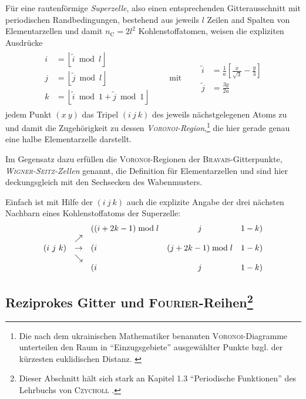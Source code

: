 \documentclass[a4paper, 10pt, twoside, openany]{book} %
\newcommand \bracks[1]{\left [ #1 \right ]}
\newcommand \floor[1]{\left \lfloor #1 \right \rfloor}
\def \mod {\bmod}
\def \nC {n_\mathrm{C}}
\begin{document}
Für eine rautenförmige \emph{Superzelle}, also einen entsprechenden Gitterausschnitt mit periodischen Randbedingungen, bestehend aus jeweils $l$ Zeilen and Spalten von Elementarzellen und damit $\nC = 2 l^2$ Kohlenstoffatomen, weisen die expliziten Ausdrücke
%
\begin{align}
    \begin{aligned}
        i &= \floor{\tilde i \mod l} \\
        j &= \floor{\tilde j \mod l} \\
        k &= \floor{\tilde i \mod 1 + \tilde j \mod 1}
    \end{aligned}
    \qquad \text{mit} \qquad
    \begin{aligned}
        \tilde i &= \frac 1 a \bracks{\frac x {\sqrt 3} - \frac y 3} \\
        \tilde j &= \frac{3 y}{2 a}
    \end{aligned}
    \label{ijk}
\end{align}
%
jedem Punkt $(x \ y)$ das Tripel $(i \ j \ k)$ des jeweils nächstgelegenen Atoms zu und damit die Zugehörigkeit zu dessen \emph{\textsc{Voronoi}-Region},\footnote{Die nach dem ukrainischen Mathematiker benannten \textsc{Voronoi}-Diagramme unterteilen den Raum in "`Einzugsgebiete"' ausgewählter Punkte bzgl. der kürzesten euklidischen Distanz. \cite[S.~10]{Edelsbrunner}} die hier gerade genau eine halbe Elementarzelle darstellt.

Im Gegensatz dazu erfüllen die \textsc{Voronoi}-Regionen der \textsc{Bravais}-Gitterpunkte, \emph{\textsc{Wigner-Seitz}-Zellen} genannt, die Definition für Elementarzellen und sind hier deckungsgleich mit den Sechsecken des Wabenmusters.

Einfach ist mit Hilfe der $(i \ j \ k)$ auch die explizite Angabe der drei nächsten Nachbarn eines Kohlenstoffatoms der Superzelle:
%
\begin{align*}
    \begin{array}{r c l c r}
        & & ((i + 2 k - 1) \mod l & j & 1 - k) \\
        & \nearrow & & & \\
        (i \ j \ k) & \rightarrow & (i & (j + 2 k - 1) \mod l & 1 - k) \\
        & \searrow & & & \\
        & & (i & j & 1 - k)
    \end{array}
\end{align*}

\subsection[Reziprokes Gitter und \textsc{Fourier}-Reihen]{Reziprokes Gitter und \textsc{Fourier}-Reihen\footnote{Dieser Abschnitt hält sich stark an Kapitel 1.3 "`Periodische Funktionen"' des Lehrbuchs von \textsc{Czycholl} \cite[S.~18f]{Czycholl}.}}
\end{document}
